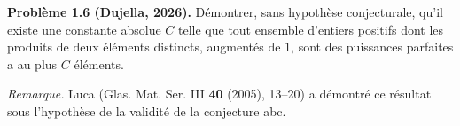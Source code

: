\textbf{Problème 1.6 (Dujella, 2026).} Démontrer, sans hypothèse conjecturale, qu'il existe une constante absolue $C$ telle que tout ensemble d'entiers positifs dont les produits de deux éléments distincts, augmentés de $1$, sont des puissances parfaites a au plus $C$ éléments.

\medskip

\textit{Remarque.} Luca (Glas. Mat. Ser. III \textbf{40} (2005), 13--20) a démontré ce résultat sous l'hypothèse de la validité de la conjecture abc.
